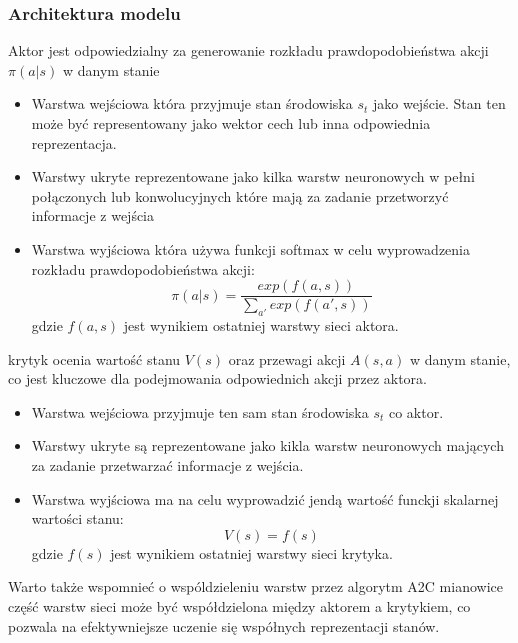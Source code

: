 \documentclass[a4paper, 10pt]{article}
\begin{document}
    \subsubsection{Architektura modelu}
    Aktor jest odpowiedzialny za generowanie rozkładu prawdopodobieństwa akcji \( \pi(a|s) \)
    w danym stanie 
    \begin{itemize}
        \item Warstwa wejściowa która przyjmuje stan środowiska \( s_t \) jako wejście. Stan ten może być representowany jako wektor cech lub inna odpowiednia reprezentacja.
        \item Warstwy ukryte reprezentowane jako kilka warstw neuronowych w pełni połączonych lub konwolucyjnych które
        mają za zadanie przetworzyć informacje z wejścia
        \item Warstwa wyjściowa która używa funkcji softmax w celu wyprowadzenia rozkładu prawdopodobieństwa akcji:
        \[ \pi(a|s) = \frac{exp(f(a,s))}{\sum_{a'}exp(f(a',s))} \]
        gdzie \( f(a,s) \) jest wynikiem ostatniej warstwy sieci aktora.
    \end{itemize}
    krytyk ocenia wartość stanu \( V(s) \) oraz przewagi akcji \( A(s,a) \) w danym stanie, co jest kluczowe dla podejmowania odpowiednich akcji przez aktora.
    \begin{itemize}
        \item Warstwa wejściowa przyjmuje ten sam stan środowiska \( s_t \) co aktor.
        \item Warstwy ukryte są reprezentowane jako kikla warstw neuronowych mających za zadanie przetwarzać informacje z wejścia.
        \item Warstwa wyjściowa ma na celu wyprowadzić jendą wartość funckji skalarnej wartości stanu:
        \[ V(s) = f(s) \]
        gdzie \( f(s) \) jest wynikiem ostatniej warstwy sieci krytyka.
    \end{itemize}
    Warto także wspomnieć o wspóldzieleniu warstw przez algorytm A2C mianowice część warstw sieci może być współdzielona między
    aktorem a krytykiem, co pozwala na efektywniejsze uczenie się współnych reprezentacji stanów.
\end{document}
